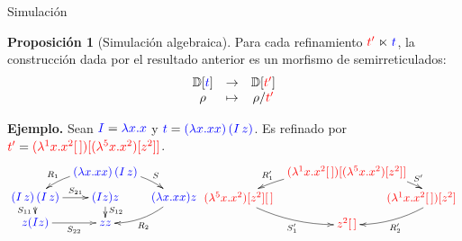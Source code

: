 \documentclass{beamer}
\theoremstyle{definition}
\newtheorem{proes}{Proposición}
\newcommand{\cLam}[1]{{\color{darkBlue} #1}}
\newcommand{\cDist}[1]{{\color{red} #1}}
\begin{document}
\begin{frame}{Simulación}
\begin{proes}[Simulación algebraica]
Para cada refinamiento $\cDist{t'} \refines \cLam{t}$, la construcción dada por el resultado
anterior es un morfismo de semirreticulados:
\[
\begin{array}{ccc}
  \ulbDeriv{\cLam{t}} & \to & \ulbDeriv{\cDist{t'}} \\
  \rho & \mapsto & \rho / \cDist{t'} \\
\end{array}
\]
\end{proes}

\textbf{Ejemplo.}
Sean $\cLam{I} = \cLam{\lam{x}{x}}$ y
$\cLam{t} = \cLam{(\lam{\var}{\var\var})\,(I\, \varthree)}$.
Es refinado por $\cDist{t'} = \cDist{(\lamp{1}{x}{x^2 [\,]}) [(\lamp{5}{x}{x^2}) [z^2]]}$.
{\scriptsize
\[
  \xymatrix@=.2cm{
  &
    \cLam{(\lam{\var}{\var\var})\,(I\, \varthree)}
    \ar@/_.25cm/[dl]_-{\redex_1}
    \ar@/^.25cm/[dr]^-{\redextwo}
  &
  &
  \\
    \cLam{(I\, \varthree)\, (I\, \varthree)}
    \ar[d]_-{\redextwo_{11}}
    \ar[r]^-{\redextwo_{21}}
  &
    \cLam{(I\varthree)\varthree}
    \ar[d]^{\redextwo_{12}}
  &
    \cLam{(\lam{\var}{\var\var})\varthree}
    \ar@/^.25cm/[dl]^-{\redex_2}
  \\
    \cLam{\varthree (I\varthree)}
    \ar[r]_-{\redextwo_{22}}
  &
    \cLam{ \varthree \varthree}
  }\hspace{-0.4cm}\xymatrix@=.2cm{
  &
    \cDist{(\lamp{1}{x}{x^2 [\,]}) [(\lamp{5}{x}{x^2}) [z^2]]}
    \ar@/_.25cm/[dl]_-{\redex'_1}
    \ar@/^.25cm/[dr]^-{\redextwo'}
  \\
    \cDist{(\lamp{5}{x}{x^2}) [z^2] [\,]}
    \ar@/_.25cm/[dr]_-{\redextwo'_1}
  &
  &
    \cDist{\hspace{-1cm}(\lamp{1}{x}{x^2 [\,]}) [z^2]}
    \ar@/^.25cm/[dl]^-{\redex'_2}
  \\
  &
    \cDist{z^2 [\,]}
  }
\]
}
\end{frame}
\end{document}
